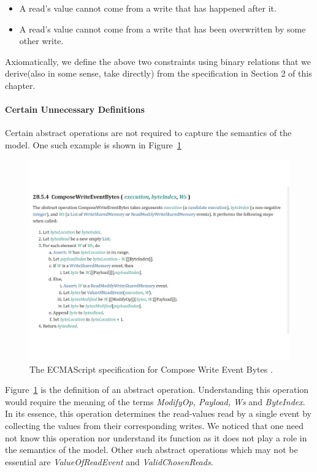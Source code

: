     \begin{itemize}
        \item A read's value cannot come from a write that has happened after it. 
        \item A read's value cannot come from a write that has been overwritten by some other write.  
    \end{itemize}
    Axiomatically, we define the above two constraints using binary relations that we derive(also in some sense, take directly) from the specification in Section 2 of this chapter. 
    
\paragraph{Certain Unnecessary Definitions}
    Certain abstract operations are not required to capture the semantics of the model. 
    One such example is shown in Figure~\ref{model:Std2}
    \begin{figure}[H]
        \centering 
        \includegraphics[scale=0.6]{3.ECMAScriptMemoryModel/ECMAScriptStd.pdf}
        \caption{The ECMAScript specification for Compose Write Event Bytes \cite{ECMA}.}
        \label{model:Std2}
    \end{figure}
    Figure~\ref{model:Std2} is the definition of an abstract operation. 
    Understanding this operation would require the meaning of the terms \textit{ModifyOp, Payload, Ws} and \textit{ByteIndex}. 
    In its essence, this operation determines the read-values read by a single event by collecting the values from their corresponding writes. 
    We noticed that one need not know this operation nor understand its function as it does not play a role in the semantics of the model. 
    Other such abstract operations which may not be essential are \textit{ValueOfReadEvent} and \textit{ValidChosenReads}\cite{ECMA}. 

